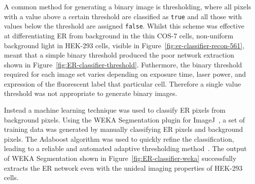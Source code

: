 A common method for generating a binary image is thresholding, where all pixels with a value above a certain threshold are classified as \texttt{true} and all those with values below the threshold are assigned \texttt{false}. 
Whilst this scheme was effective at differentiating ER from background in the thin COS-7 cells, non-uniform background light in HEK-293 cells, visible in Figure~\ref{fig:er-classifier-recon-561}, meant that a simple binary threshold produced the poor network extraction shown in Figure~\ref{fig:ER-classifier-threshold}. 
Futhermore, the binary threshold required for each image set varies depending on exposure time, laser power, and expression of the fluorescent label that particular cell. 
Therefore a single value threshold was not appropriate to generate binary images. 

Instead a machine learning technique was used to classify ER pixels from background pixels. 
Using the WEKA Segmentation plugin for ImageJ~\cite{arganda2017trainable}, a set of training data was generated by manually classifying ER pixels and background pixels. 
The Adaboost algorithm was used to quickly refine the classification, leading to a reliable and automated adaptive thresholding method~\cite{freund1997decision, schapire1999brief}. 
The output of WEKA Segmentation shown in Figure~\ref{fig:ER-classifier-weka} successfully extracts the ER network even with the unideal imaging properties of HEK-293 cells. 

